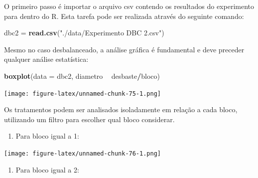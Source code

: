\documentclass[
]{article}
\newenvironment{Shaded}{\begin{snugshade}}{\end{snugshade}}
\newcommand{\DataTypeTok}[1]{\textcolor[rgb]{0.13,0.29,0.53}{#1}}
\newcommand{\DecValTok}[1]{\textcolor[rgb]{0.00,0.00,0.81}{#1}}
\newcommand{\KeywordTok}[1]{\textcolor[rgb]{0.13,0.29,0.53}{\textbf{#1}}}
\newcommand{\NormalTok}[1]{#1}
\newcommand{\OperatorTok}[1]{\textcolor[rgb]{0.81,0.36,0.00}{\textbf{#1}}}
\newcommand{\StringTok}[1]{\textcolor[rgb]{0.31,0.60,0.02}{#1}}
\providecommand{\tightlist}{%
  \setlength{\itemsep}{0pt}\setlength{\parskip}{0pt}}
\begin{document}
O primeiro passo é importar o arquivo csv contendo os resultados do experimento para dentro do R. Esta tarefa pode ser realizada através do seguinte comando:

\begin{Shaded}
\begin{Highlighting}[]
\NormalTok{dbc2 =}\StringTok{ }\KeywordTok{read.csv}\NormalTok{(}\StringTok{"./data/Experimento DBC 2.csv"}\NormalTok{)}
\end{Highlighting}
\end{Shaded}

Mesmo no caso desbalanceado, a análise gráfica é fundamental e deve preceder qualquer análise estatística:

\begin{Shaded}
\begin{Highlighting}[]
\KeywordTok{boxplot}\NormalTok{(}\DataTypeTok{data =}\NormalTok{ dbc2, diametro }\OperatorTok{~}\StringTok{ }\NormalTok{desbaste}\OperatorTok{/}\NormalTok{bloco)}
\end{Highlighting}
\end{Shaded}

\texttt{[image: figure-latex/unnamed-chunk-75-1.png]}

Os tratamentos podem ser analisados isoladamente em relação a cada bloco, utilizando um filtro para escolher qual bloco considerar.

\begin{enumerate}
\def\labelenumi{\arabic{enumi}.}
\tightlist
\item
  Para bloco igual a 1:
\end{enumerate}

\begin{Shaded}
\end{Shaded}

\texttt{[image: figure-latex/unnamed-chunk-76-1.png]}

\begin{enumerate}
\def\labelenumi{\arabic{enumi}.}
\setcounter{enumi}{1}
\tightlist
\item
  Para bloco igual a 2:
\end{enumerate}
\end{document}
